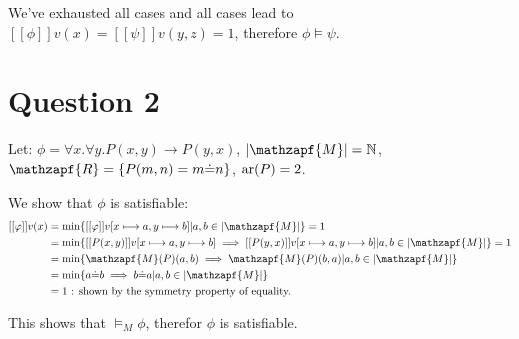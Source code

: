 \documentclass{article}
\begin{document}
We've exhausted all cases and all cases lead to  $ [[\phi]]v(x) = [[\psi]]v(y,z) = 1 $, therefore $ \phi  \models \psi $.

\section*{Question 2}
Let: $ \phi = \forall x. \forall y. P(x,y) \rightarrow P(y,x) $, $ |\mathzapf{M}| = \mathbb{N} $, $ \mathzapf{R} = \{P(m,n) = m \dot{=} n \} $, $ \mathrm{ar}(P) = 2 $.

We show that $\phi$ is satisfiable:
\begin{equation*}
\begin{split}
[[\phi]]v(x) &= \min\{[[\phi]]v[x \longmapsto a, y \longmapsto b] | a,b \in |\mathzapf{M}| \} = 1 \\
& = \min\{[[P(x,y)]]v[x \longmapsto a, y \longmapsto b] \implies [[P(y,x)]]v[x \longmapsto a, y \longmapsto b] | a,b \in |\mathzapf{M}| \} = 1 \\
& = \min\{\mathzapf{M}(P)(a,b) \implies \mathzapf{M}(P)(b,a) | a,b \in |\mathzapf{M}| \}  \\
& = \min\{a \dot{=} b \implies b \dot{=} a | a,b \in |\mathzapf{M}| \} \\
& = 1 \text{ : shown by the symmetry property of equality. }
\end{split}
\end{equation*}

This shows that $ \models_M \phi $, therefor $ \phi $ is satisfiable.
\end{document}
